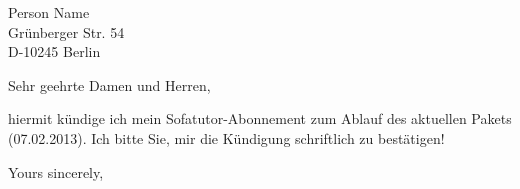 \documentclass[11pt]{dinbrief}
\begin{document}
\begin{letter} {Person Name\\Grünberger Str. 54\\D-10245 Berlin}
\centeraddress                 %

\def\yourmailmsg{} %
\def\signmsg{}
\def\phonemsg{}

\date{\today}

\subject{\textbf{Subject Name}}
\opening{Sehr geehrte Damen und Herren,}

hiermit kündige ich mein Sofatutor-Abonnement zum Ablauf des aktuellen Pakets (07.02.2013).
Ich bitte Sie, mir die Kündigung schriftlich zu bestätigen!

 

\closing{Yours sincerely,}

\end{letter}
\end{document}
